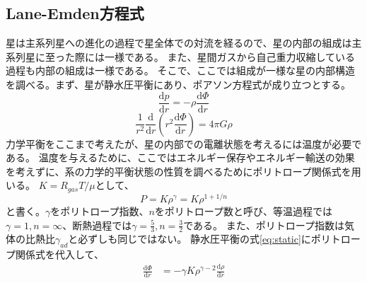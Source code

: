 \documentclass[a4j, dvipdfmx]{jsarticle}
\newcommand{\dder}[2][]{\frac{\mathrm{d}#1}{\mathrm{d}#2}}
\begin{document}
\subsection{Lane-Emden方程式}
星は主系列星への進化の過程で星全体での対流を経るので、星の内部の組成は主系列星に至った際には一様である。
また、星間ガスから自己重力収縮している過程も内部の組成は一様である。
そこで、ここでは組成が一様な星の内部構造を調べる。まず、星が静水圧平衡にあり、ポアソン方程式が成り立つとする。
\begin{equation}
    \dder[p]{r} = - \rho\dder[\Phi]{r}\label{eq:static}
\end{equation}
\begin{equation}
    \frac{1}{r^2}\dder[]{r}(r^2\dder[\Phi]{r}) = 4\pi G\rho\label{eq:poisson}
\end{equation}
力学平衡をここまで考えたが、星の内部での電離状態を考えるには温度が必要である。
温度を与えるために、ここではエネルギー保存やエネルギー輸送の効果を考えずに、系の力学的平衡状態の性質を調べるためにポリトロープ関係式を用いる。
$K = R_{gas}T/\mu$として、
\begin{equation}
    P = K \rho^\gamma = K\rho^{1+1/n}\label{eq:polytropic}
\end{equation}
と書く。$\gamma$をポリトロープ指数、$n$をポリトロープ数と呼び、等温過程では$\gamma = 1, n = \infty$、断熱過程では$\gamma = \frac{5}{3}, n =\frac{3}{2}$である。
また、ポリトロープ指数は気体の比熱比$\gamma_{ad}$と必ずしも同じではない。
静水圧平衡の式\eqref{eq:static}にポリトロープ関係式を代入して、
\begin{align}
    \dder[\Phi]{r} &= - \gamma K \rho^{\gamma -2} \dder[\rho]{r}\label{eq:staticpoly}
\end{align}
\end{document}
